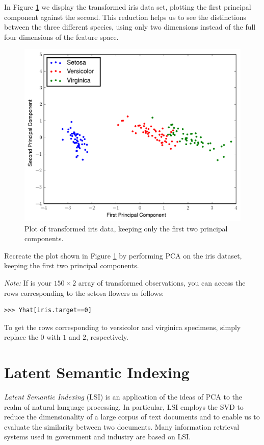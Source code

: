 In Figure \ref{fig:iris_pca} we display the transformed iris data set, plotting the first principal component against the second. This reduction helps us to see the distinctions between the three different species, using only two dimensions instead of the full four dimensions of the feature space.
\begin{figure}
\includegraphics[width=\textwidth]{iris_pca.pdf}
\caption{Plot of transformed iris data, keeping only the first two principal components.}
\label{fig:iris_pca}
\end{figure}

\begin{problem}
Recreate the plot shown in Figure \ref{fig:iris_pca} by performing PCA on the iris dataset, keeping the first two principal components.

\emph{Note:}
If  is your $150 \times 2$ array of transformed observations, you can access the rows corresponding to the setosa flowers as follows:
\begin{lstlisting}
>>> Yhat[iris.target==0]
\end{lstlisting}
To get the rows corresponding to versicolor and virginica specimens, simply replace the $0$ with $1$ and $2$, respectively.
\end{problem}

\section*{Latent Semantic Indexing}
\emph{Latent Semantic Indexing} (LSI) is an application of the ideas of PCA to the realm of natural language processing. 
In particular, LSI employs the SVD to reduce the dimensionality of a large corpus of text documents and to enable us to evaluate the similarity between two documents.
Many information retrieval systems used in government and industry are based on LSI.

